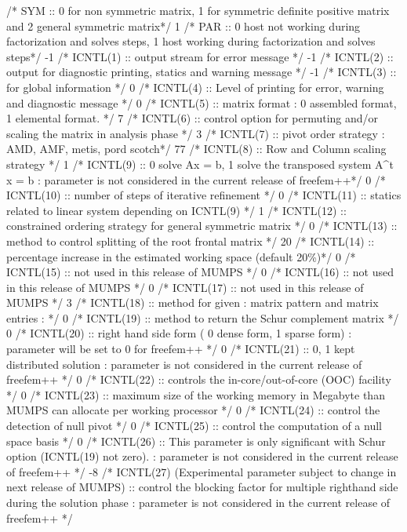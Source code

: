 \documentclass[a4paper,twoside,12pt]{book}
\begin{document}
          /* SYM :: 0 for non symmetric matrix, 1 for symmetric definite positive matrix and 2 general symmetric matrix*/
1          /* PAR :: 0 host not working during factorization and solves steps, 1 host working during factorization and solves steps*/
 -1        /* ICNTL(1) :: output stream for error message  */
 -1        /* ICNTL(2) :: output for diagnostic printing, statics and warning message */
 -1        /* ICNTL(3) :: for global information */
 0         /* ICNTL(4) :: Level of printing for error, warning and diagnostic message */
 0         /* ICNTL(5) :: matrix format : 0 assembled format, 1 elemental format. */
 7         /* ICNTL(6) :: control option for permuting and/or scaling the matrix in analysis phase  */
 3         /* ICNTL(7) :: pivot order strategy : AMD, AMF, metis, pord scotch*/
 77        /* ICNTL(8) :: Row and Column scaling strategy */
 1         /* ICNTL(9) :: 0 solve Ax = b, 1 solve the transposed system  A^t x = b :  parameter is not considered in the current release of freefem++*/
 0         /* ICNTL(10) :: number of steps of iterative refinement */
 0         /* ICNTL(11) :: statics related to linear system depending on ICNTL(9) */
 1         /* ICNTL(12) :: constrained ordering strategy for general symmetric matrix */
 0         /* ICNTL(13) :: method to control splitting of the root frontal matrix */
 20        /* ICNTL(14) :: percentage increase in the estimated working space (default 20\%)*/
 0         /* ICNTL(15) :: not used in this release of MUMPS */
 0         /* ICNTL(16) :: not used in this release of MUMPS */
 0         /* ICNTL(17) :: not used in this release of MUMPS */
 3         /* ICNTL(18) :: method for given : matrix pattern and matrix entries  : */
 0         /* ICNTL(19) :: method to return the Schur complement matrix */
 0         /* ICNTL(20) :: right hand side form ( 0 dense form, 1 sparse form) : parameter will be set to 0 for freefem++ */
 0         /* ICNTL(21) :: 0, 1 kept distributed solution : parameter is not considered in the current release of freefem++ */
 0         /* ICNTL(22) :: controls the in-core/out-of-core (OOC) facility */
 0         /* ICNTL(23) :: maximum size of the working memory in Megabyte than MUMPS can allocate per working processor */
 0         /* ICNTL(24) :: control the detection of null pivot */
 0         /* ICNTL(25) :: control the computation of a null space basis */
 0         /* ICNTL(26) :: This parameter is only significant with Schur option (ICNTL(19) not zero). : parameter is not considered in the current release of freefem++ */
 -8        /* ICNTL(27) (Experimental parameter subject to change in next release of MUMPS) :: control the blocking factor for multiple righthand side during the solution phase : parameter is not considered in the current release of freefem++ */
\end{document}
